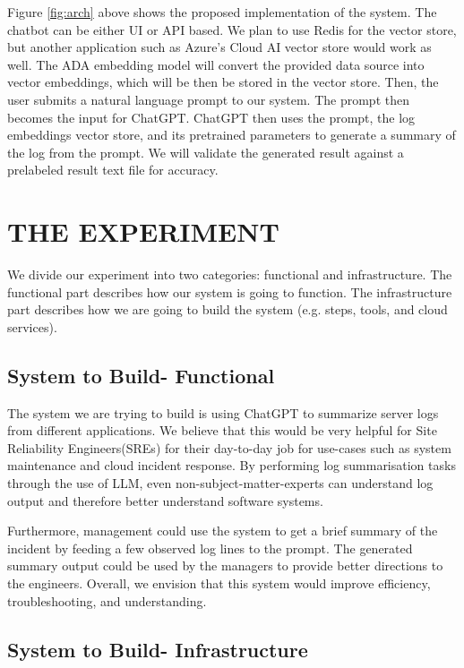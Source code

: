 \documentclass[conference]{IEEEtran}
\begin{document}
Figure \ref{fig:arch} above shows the proposed implementation of the system. The chatbot can be either UI or API based. We plan to use Redis for the vector store, but another application such as Azure's Cloud AI vector store would work as well. The ADA embedding model will convert the provided data source into vector embeddings, which will be then be stored in the vector store. Then, the user submits a natural language prompt to our system. The prompt then becomes the input for ChatGPT. ChatGPT then uses the prompt, the log embeddings vector store, and its pretrained parameters to generate a summary of the log from the prompt. We will validate the generated result against a prelabeled result text file for accuracy. 


\section{THE EXPERIMENT}

We divide our experiment into two categories: functional and infrastructure. The functional part describes how our system is going to function. The infrastructure part describes how we are going to build the system (e.g. steps, tools, and cloud services).

\subsection{System to Build- Functional}

The system we are trying to build is using ChatGPT to summarize server logs from different applications. We believe that this would be very helpful for Site Reliability Engineers(SREs) for their day-to-day job for use-cases such as system maintenance and cloud incident response. By performing log summarisation tasks through the use of LLM, even non-subject-matter-experts can understand log output and therefore better understand software systems.

Furthermore, management could use the system to get a brief summary of the incident by feeding a few observed log lines to the prompt. The generated summary output could be used by the managers to provide better directions to the engineers. Overall, we envision that this system would improve efficiency, troubleshooting, and understanding.

\subsection{System to Build- Infrastructure}
\end{document}
